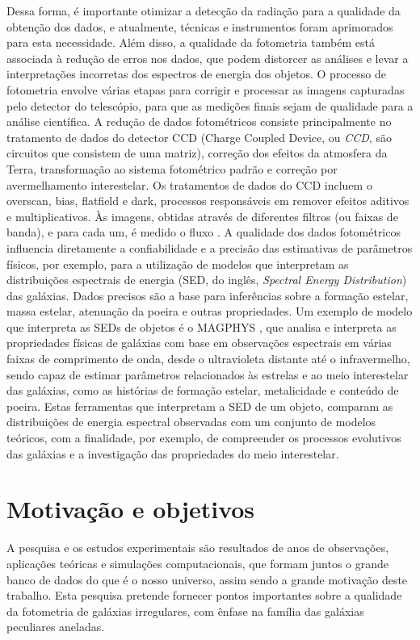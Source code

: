 Dessa forma, é importante otimizar a detecção da radiação para a qualidade da obtenção dos dados, e atualmente, técnicas e instrumentos foram aprimorados para esta necessidade. Além disso, a qualidade da fotometria também está associada à redução de erros nos dados, que podem distorcer as análises e levar a interpretações incorretas dos espectros de energia dos objetos. O processo de fotometria envolve várias etapas para corrigir e processar as imagens capturadas pelo detector do telescópio, para que as medições finais sejam de qualidade para a análise científica. A redução de dados fotométricos consiste principalmente no tratamento de dados do detector CCD (Charge Coupled Device, ou \emph{CCD}, são circuitos que consistem de uma matriz), correção dos efeitos da atmosfera da Terra, transformação ao sistema fotométrico padrão e correção por avermelhamento interestelar. Os tratamentos de dados do CCD incluem o overscan, bias, flatfield e dark, processos responsáveis em remover efeitos aditivos e multiplicativos. Às imagens, obtidas através de diferentes filtros (ou faixas de banda), e para cada um, é medido o fluxo \cite{2023Kepler}. A qualidade dos dados fotométricos influencia diretamente a confiabilidade e a precisão das estimativas de parâmetros físicos, por exemplo, para a utilização de modelos que interpretam as distribuições espectrais de energia (SED, do inglês, \emph{Spectral Energy Distribution}) das galáxias. Dados precisos são a base para inferências sobre a formação estelar, massa estelar, atenuação da poeira e outras propriedades. Um exemplo de modelo que interpreta as SEDs de objetos é o MAGPHYS \cite{2011ascl.soft06010D}, que analisa e interpreta as propriedades físicas de galáxias com base em observações espectrais em várias faixas de comprimento de onda, desde o ultravioleta distante até o infravermelho, sendo capaz de estimar parâmetros relacionados às estrelas e ao meio interestelar das galáxias, como as histórias de formação estelar, metalicidade e conteúdo de poeira. Estas ferramentas que interpretam a SED de um objeto, comparam as distribuições de energia espectral observadas com um conjunto de modelos teóricos, com a finalidade, por exemplo, de compreender os processos evolutivos das galáxias e a investigação das propriedades do meio interestelar.


\section{Motivação e objetivos}

A pesquisa e os estudos experimentais são resultados de anos de observações, aplicações teóricas e simulações computacionais, que formam juntos o grande banco de dados do que é o nosso universo, assim sendo a grande motivação deste trabalho. Esta pesquisa pretende fornecer pontos importantes sobre a qualidade da fotometria de galáxias irregulares, com ênfase na família das galáxias peculiares aneladas.

